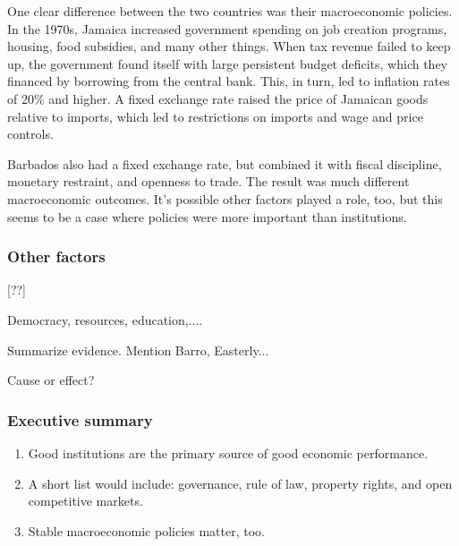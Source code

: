 \documentclass[letterpaper,12pt]{article}
\begin{document}
One clear difference between the two countries was their
macroeconomic policies.
In the 1970s, Jamaica increased government spending
on job creation programs, housing, food subsidies, and many other things.
When tax revenue failed to keep up, the government found itself
with large persistent budget deficits, which they financed by
borrowing from the central bank.
This, in turn, led to inflation rates of 20\% and higher.
A fixed exchange rate raised the price of Jamaican goods relative to imports,
which led to restrictions on imports and wage and price controls.

Barbados also had a fixed exchange rate,
but combined it with fiscal discipline, monetary restraint,
and openness to trade.
The result was much different macroeconomic outcomes.
It's possible other factors played a role, too,
but this seems to be a case where policies were more
important than institutions.


\subsubsection*{Other factors}

[??]

Democracy, resources, education,....

Summarize evidence.  Mention Barro, Easterly...

Cause or effect?  

\subsubsection*{Executive summary}

\begin{enumerate}
\item Good institutions are the primary source of good economic performance.
\item A short list would include:  governance, rule of law,
property rights, and open competitive markets.
\item Stable macroeconomic policies matter, too.
\end{enumerate}


\begin{comment}
\subsubsection*{Review questions}

\begin{enumerate}
\item ...
\end{enumerate}
\end{comment}
\end{document}
